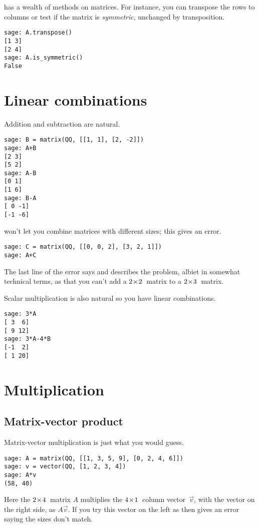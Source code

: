 \Sage{} has a wealth of methods on matrices.
For instance, you can transpose the rows to columns or test if the 
matrix is \textit{symmetric},
unchanged by transposition.
\begin{lstlisting}
sage: A.transpose()
[1 3]
[2 4]
sage: A.is_symmetric()
False  
\end{lstlisting}


\section{Linear combinations}
Addition and subtraction are natural.
\begin{lstlisting}
sage: B = matrix(QQ, [[1, 1], [2, -2]])
sage: A+B
[2 3]
[5 2]
sage: A-B
[0 1]
[1 6]
sage: B-A
[ 0 -1]
[-1 -6]
\end{lstlisting}

\Sage{} won't let you combine matrices with different sizes; this gives an 
error. 
\begin{lstlisting}
sage: C = matrix(QQ, [[0, 0, 2], [3, 2, 1]])
sage: A+C
\end{lstlisting}
The last line of the error says
and describes the problem, albiet in somewhat technical terms, as that
you can't add a 
$2 \! \times \! 2$~matrix to a $2 \! \times \! 3$~matrix.

Scalar multiplication is also natural
so you have linear combinations.
\begin{lstlisting}
sage: 3*A
[ 3  6]
[ 9 12]
sage: 3*A-4*B
[-1  2]
[ 1 20]  
\end{lstlisting}



\section{Multiplication}

\subsection{Matrix-vector product}
Matrix-vector multiplication is just what you would guess.
\begin{lstlisting}
sage: A = matrix(QQ, [[1, 3, 5, 9], [0, 2, 4, 6]])
sage: v = vector(QQ, [1, 2, 3, 4])
sage: A*v
(58, 40)  
\end{lstlisting}
Here the $2 \! \times \! 4$~matrix $A$ multiplies the 
$4 \! \times \! 1$~column vector~$\vec{v}$, with the vector on the right side,
as $A\vec{v}$.
If you try this vector on the left as 
 then \Sage{} gives an error saying the sizes don't 
match.

